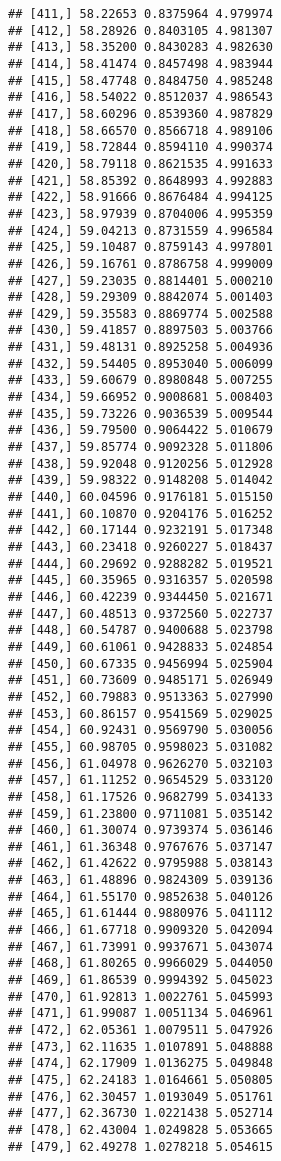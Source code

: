 \documentclass[]{book}
\theoremstyle{definition}
\theoremstyle{definition}
\theoremstyle{definition}
\theoremstyle{remark}
\begin{document}
\begin{verbatim}
## [411,] 58.22653 0.8375964 4.979974
## [412,] 58.28926 0.8403105 4.981307
## [413,] 58.35200 0.8430283 4.982630
## [414,] 58.41474 0.8457498 4.983944
## [415,] 58.47748 0.8484750 4.985248
## [416,] 58.54022 0.8512037 4.986543
## [417,] 58.60296 0.8539360 4.987829
## [418,] 58.66570 0.8566718 4.989106
## [419,] 58.72844 0.8594110 4.990374
## [420,] 58.79118 0.8621535 4.991633
## [421,] 58.85392 0.8648993 4.992883
## [422,] 58.91666 0.8676484 4.994125
## [423,] 58.97939 0.8704006 4.995359
## [424,] 59.04213 0.8731559 4.996584
## [425,] 59.10487 0.8759143 4.997801
## [426,] 59.16761 0.8786758 4.999009
## [427,] 59.23035 0.8814401 5.000210
## [428,] 59.29309 0.8842074 5.001403
## [429,] 59.35583 0.8869774 5.002588
## [430,] 59.41857 0.8897503 5.003766
## [431,] 59.48131 0.8925258 5.004936
## [432,] 59.54405 0.8953040 5.006099
## [433,] 59.60679 0.8980848 5.007255
## [434,] 59.66952 0.9008681 5.008403
## [435,] 59.73226 0.9036539 5.009544
## [436,] 59.79500 0.9064422 5.010679
## [437,] 59.85774 0.9092328 5.011806
## [438,] 59.92048 0.9120256 5.012928
## [439,] 59.98322 0.9148208 5.014042
## [440,] 60.04596 0.9176181 5.015150
## [441,] 60.10870 0.9204176 5.016252
## [442,] 60.17144 0.9232191 5.017348
## [443,] 60.23418 0.9260227 5.018437
## [444,] 60.29692 0.9288282 5.019521
## [445,] 60.35965 0.9316357 5.020598
## [446,] 60.42239 0.9344450 5.021671
## [447,] 60.48513 0.9372560 5.022737
## [448,] 60.54787 0.9400688 5.023798
## [449,] 60.61061 0.9428833 5.024854
## [450,] 60.67335 0.9456994 5.025904
## [451,] 60.73609 0.9485171 5.026949
## [452,] 60.79883 0.9513363 5.027990
## [453,] 60.86157 0.9541569 5.029025
## [454,] 60.92431 0.9569790 5.030056
## [455,] 60.98705 0.9598023 5.031082
## [456,] 61.04978 0.9626270 5.032103
## [457,] 61.11252 0.9654529 5.033120
## [458,] 61.17526 0.9682799 5.034133
## [459,] 61.23800 0.9711081 5.035142
## [460,] 61.30074 0.9739374 5.036146
## [461,] 61.36348 0.9767676 5.037147
## [462,] 61.42622 0.9795988 5.038143
## [463,] 61.48896 0.9824309 5.039136
## [464,] 61.55170 0.9852638 5.040126
## [465,] 61.61444 0.9880976 5.041112
## [466,] 61.67718 0.9909320 5.042094
## [467,] 61.73991 0.9937671 5.043074
## [468,] 61.80265 0.9966029 5.044050
## [469,] 61.86539 0.9994392 5.045023
## [470,] 61.92813 1.0022761 5.045993
## [471,] 61.99087 1.0051134 5.046961
## [472,] 62.05361 1.0079511 5.047926
## [473,] 62.11635 1.0107891 5.048888
## [474,] 62.17909 1.0136275 5.049848
## [475,] 62.24183 1.0164661 5.050805
## [476,] 62.30457 1.0193049 5.051761
## [477,] 62.36730 1.0221438 5.052714
## [478,] 62.43004 1.0249828 5.053665
## [479,] 62.49278 1.0278218 5.054615

\end{verbatim}
\end{document}
